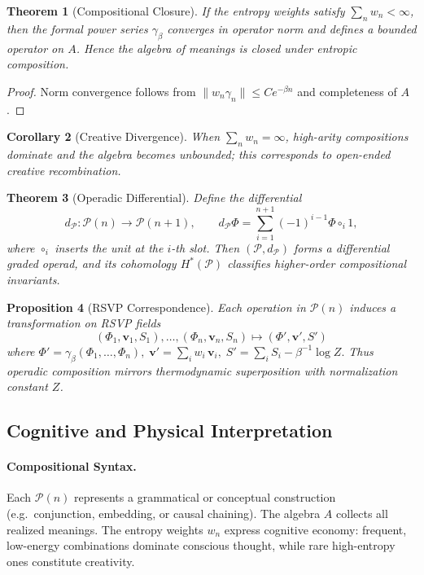 \documentclass[12pt,a4paper,twoside,openright]{book}
\newtheorem{theorem}{Theorem}
\newtheorem{proposition}[theorem]{Proposition}
\newtheorem{corollary}[theorem]{Corollary}
\begin{document}
\begin{theorem}[Compositional Closure]
\label{thm:closure}
If the entropy weights satisfy $\sum_n w_n<\infty$,
then the formal power series $\gamma_\beta$ converges in operator norm and defines a bounded operator on $A$.
Hence the algebra of meanings is closed under entropic composition.
\end{theorem}

\begin{proof}
Norm convergence follows from $\|w_n\gamma_n\|\!\le\!Ce^{-\beta n}$ and completeness of $A$.
\end{proof}

\begin{corollary}[Creative Divergence]
When $\sum_n w_n=\infty$, high-arity compositions dominate and the algebra becomes unbounded;  
this corresponds to open-ended creative recombination.
\end{corollary}

\begin{theorem}[Operadic Differential]
\label{thm:operad-diff}
Define the differential
\[
d_{\mathcal{P}}\colon\mathcal{P}(n)\!\to\!\mathcal{P}(n\!+\!1),
\qquad
d_{\mathcal{P}}\Phi
 = \sum_{i=1}^{n+1} (-1)^{i-1}\Phi\circ_i 1,
\]
where $\circ_i$ inserts the unit at the $i$-th slot.  
Then $(\mathcal{P},d_{\mathcal{P}})$ forms a differential graded operad, and its cohomology $H^*(\mathcal{P})$ classifies higher-order compositional invariants.
\end{theorem}

\begin{proposition}[RSVP Correspondence]
Each operation in $\mathcal{P}(n)$ induces a transformation on RSVP fields
\[
(\Phi_1,\mathbf{v}_1,S_1),\ldots,(\Phi_n,\mathbf{v}_n,S_n)
 \longmapsto
(\Phi',\mathbf{v}',S')
\]
where
\(
\Phi' = \gamma_\beta(\Phi_1,\ldots,\Phi_n),
\;
\mathbf{v}' = \sum_i w_i\,\mathbf{v}_i,
\;
S' = \sum_i S_i - \beta^{-1}\log Z.
\)
Thus operadic composition mirrors thermodynamic superposition with normalization constant $Z$.
\end{proposition}

\subsection*{Cognitive and Physical Interpretation}

\paragraph{Compositional Syntax.}
Each $\mathcal{P}(n)$ represents a grammatical or conceptual construction (e.g.\ conjunction, embedding, or causal chaining).  
The algebra $A$ collects all realized meanings.  
The entropy weights $w_n$ express cognitive economy: frequent, low-energy combinations dominate conscious thought, while rare high-entropy ones constitute creativity.
\end{document}
